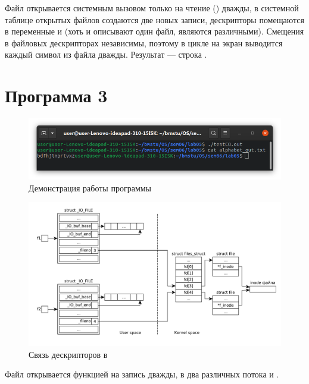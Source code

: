 \documentclass[a4paper,oneside,12pt]{extreport}
\begin{document}
Файл  открывается системным вызовом  только на чтение () дважды, в системной таблице открытых файлов создаются две новых записи, дескрипторы помещаются в переменные  и  (хоть и описывают один файл, являются различными).
Смещения в файловых дескрипторах независимы, поэтому в цикле на экран выводится каждый символ из файла дважды.
Результат — строка .

\section*{Программа 3}



\begin{figure}[H]
	\centering
	\includegraphics[width=\linewidth]{inc/img/testCO-runtime}
	\caption{Демонстрация работы программы }
	\label{img:testCO-runtime}
\end{figure}

\begin{figure}[H]
	\centering
	\includegraphics[scale=0.65]{inc/img/testCO}
	\caption{Связь дескрипторов в }
	\label{img:testCO}
\end{figure}

Файл  открывается функцией  на запись дважды, в два различных потока  и .
\end{document}
